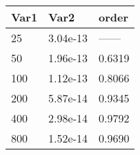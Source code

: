 \begin{tabular}{lll}
Var1 & Var2 & order \\ 
\hline 
25 & 3.04e-13 & ------ \\ 
50 & 1.96e-13 & 0.6319 \\ 
100 & 1.12e-13 & 0.8066 \\ 
200 & 5.87e-14 & 0.9345 \\ 
400 & 2.98e-14 & 0.9792 \\ 
800 & 1.52e-14 & 0.9690 \\ 
\hline 
\end{tabular}